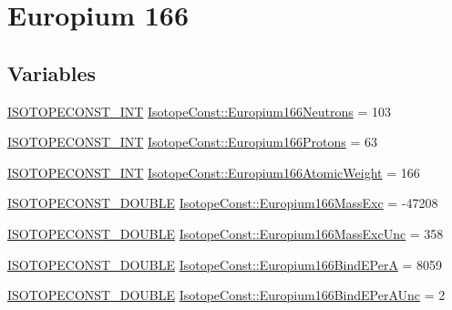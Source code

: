 \hypertarget{group___isotope_const-_europium-_eu166}{}\section{Europium 166}
\label{group___isotope_const-_europium-_eu166}
\subsection*{Variables}
\begin{DoxyCompactItemize}
\item 
\mbox{\hyperlink{group___isotope_const-_macros_ga5f18360b3e99483a35c32d789e62621c}{I\+S\+O\+T\+O\+P\+E\+C\+O\+N\+S\+T\+\_\+\+I\+NT}} \mbox{\hyperlink{group___isotope_const-_europium-_eu166_gaed1286c3ca7a8992a8013d0ef3fc6400}{Isotope\+Const\+::\+Europium166\+Neutrons}} = 103
\item 
\mbox{\hyperlink{group___isotope_const-_macros_ga5f18360b3e99483a35c32d789e62621c}{I\+S\+O\+T\+O\+P\+E\+C\+O\+N\+S\+T\+\_\+\+I\+NT}} \mbox{\hyperlink{group___isotope_const-_europium-_eu166_gac447218b2c886b963958b87fb8cca725}{Isotope\+Const\+::\+Europium166\+Protons}} = 63
\item 
\mbox{\hyperlink{group___isotope_const-_macros_ga5f18360b3e99483a35c32d789e62621c}{I\+S\+O\+T\+O\+P\+E\+C\+O\+N\+S\+T\+\_\+\+I\+NT}} \mbox{\hyperlink{group___isotope_const-_europium-_eu166_gaae8e5b60f7a3a90a212b5fba30c57c69}{Isotope\+Const\+::\+Europium166\+Atomic\+Weight}} = 166
\item 
\mbox{\hyperlink{group___isotope_const-_macros_ga8f45a7272ce02c0b4c65c44636ed719a}{I\+S\+O\+T\+O\+P\+E\+C\+O\+N\+S\+T\+\_\+\+D\+O\+U\+B\+LE}} \mbox{\hyperlink{group___isotope_const-_europium-_eu166_ga8dd15ad5c2452ce487c3b998968c908a}{Isotope\+Const\+::\+Europium166\+Mass\+Exc}} = -\/47208
\item 
\mbox{\hyperlink{group___isotope_const-_macros_ga8f45a7272ce02c0b4c65c44636ed719a}{I\+S\+O\+T\+O\+P\+E\+C\+O\+N\+S\+T\+\_\+\+D\+O\+U\+B\+LE}} \mbox{\hyperlink{group___isotope_const-_europium-_eu166_ga7a8f1ad98cf71ef014d55a2a4693d4fd}{Isotope\+Const\+::\+Europium166\+Mass\+Exc\+Unc}} = 358
\item 
\mbox{\hyperlink{group___isotope_const-_macros_ga8f45a7272ce02c0b4c65c44636ed719a}{I\+S\+O\+T\+O\+P\+E\+C\+O\+N\+S\+T\+\_\+\+D\+O\+U\+B\+LE}} \mbox{\hyperlink{group___isotope_const-_europium-_eu166_ga2a6cecd5c3b32380b45e587f0531439d}{Isotope\+Const\+::\+Europium166\+Bind\+E\+PerA}} = 8059
\item 
\mbox{\hyperlink{group___isotope_const-_macros_ga8f45a7272ce02c0b4c65c44636ed719a}{I\+S\+O\+T\+O\+P\+E\+C\+O\+N\+S\+T\+\_\+\+D\+O\+U\+B\+LE}} \mbox{\hyperlink{group___isotope_const-_europium-_eu166_ga783d8267f7506da643f19321a34f6240}{Isotope\+Const\+::\+Europium166\+Bind\+E\+Per\+A\+Unc}} = 2

\end{DoxyCompactItemize}
